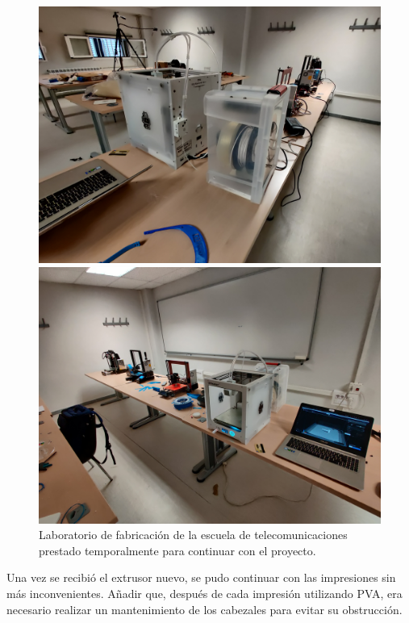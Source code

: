 \begin{figure}[H]
    \centering
    \begin{minipage}{.49\linewidth}
        \includegraphics[width=\linewidth]{pictures/teleco-1.jpg}
    \end{minipage}
    \hfill
    \begin{minipage}{.49\linewidth}
        \includegraphics[width=\linewidth]{pictures/teleco_2.jpg}
    \end{minipage}
    \caption{Laboratorio de fabricación de la escuela de telecomunicaciones prestado temporalmente para continuar con el proyecto.}
    \label{fig:telec}
\end{figure}

Una vez se recibió el extrusor nuevo, se pudo continuar con las impresiones sin
más inconvenientes. Añadir que, después de cada impresión utilizando \ac{PVA}, era
necesario realizar un mantenimiento de los cabezales para evitar su obstrucción.